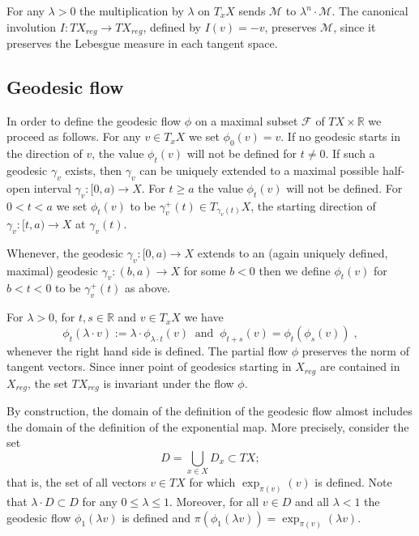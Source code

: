 \documentclass[12pt,leqno,intlimits]{amsart}
\numberwithin{equation}{section}
\theoremstyle{definition}
\theoremstyle{remark}
\newcommand{\R}{\mathbb{R}}
\def\:{\colon}
\begin{document}
 For any $\lambda >0$ the multiplication by $\lambda$  on  $T_xX$ sends $\mathcal M $ to $\lambda ^n \cdot \mathcal M$.
The canonical involution $I\:TX_{reg}\to TX_{reg}$, defined by $I(v)=-v$,
 preserves $\mathcal M$, since it preserves the Lebesgue measure in each tangent space.


\subsection{Geodesic flow}
   In order to define the geodesic flow $\phi$ on a maximal subset   $\mathcal F$ of $TX \times \R $  we proceed as follows.
 For any  $v\in  T_xX$ we set $\phi _0(v)=v$.
 If no geodesic starts in the direction of $v$,
 the value $\phi _t(v)$ will not be defined for $t\neq 0$. If such a geodesic $\gamma_v$ exists, then $\gamma_v$   can be uniquely extended to a maximal possible half-open  interval $\gamma_v \:[0,a)\to X$.  For $t\geq a$
 the value $\phi _t(v)$ will not be defined. For $0<t<a$ we set $\phi _t(v)$ to be $\gamma _v ^+ (t) \in T_{\gamma _v(t)} X$, the starting direction of $\gamma_v\:[t,a) \to X$ at $\gamma_v (t)$.

 Whenever, the geodesic $\gamma _v\:[0,a)\to X$ extends to an (again uniquely defined, maximal)  geodesic   $\gamma_v\:(b,a) \to X$ for some $b<0$
 then we define $\phi _t(v)$ for $b<t<0$ to be $\gamma_v ^+ (t) $ as above.


For $\lambda >0$, for $t,s\in \R$  and $v\in  T_x X$ we have
 $$\phi _t(\lambda \cdot  v) :=\lambda \cdot \phi _{\lambda  \cdot t} (v) \; \;  \text{and}  \;  \;   \phi _{t+s} (v) =\phi _t ( \phi _s (v)) \; ,$$
 whenever the right hand side is defined.
The partial flow $\phi$ preserves the norm of tangent vectors.  Since inner point of geodesics starting in $X_{reg}$ are contained in $X_{reg}$, the set  $TX_{reg}$ is invariant under the  flow $\phi$.


By construction, the domain of the definition of the  geodesic flow almost includes the domain of the definition of the exponential map.
More precisely, consider the set
\[D=\bigcup_{x\in X} D_x\subset TX;\]
that is, the set of all vectors $v\in TX$ for which $\exp _{\pi(v)} (v)$ is defined.
Note that $\lambda\cdot D\subset D$ for any $0\leq \lambda \leq 1$.
Moreover, for all $v\in D$ and all $\lambda <1$
 the geodesic flow $\phi_1 (\lambda v)$ is defined and $\pi (\phi_1 (\lambda v))=  \exp _{\pi (v)} (\lambda v)$.
\end{document}
